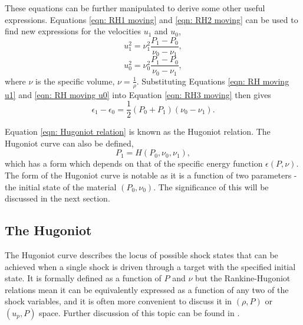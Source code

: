 These equations can be further manipulated to derive some other useful expressions. Equations \ref{eqn: RH1 moving} and \ref{eqn: RH2 moving} can be used to find new expressions for the velocities $u_1$ and $u_0$, 
\begin{equation} u_1^2 = \nu_1^2 \frac{P_1 - P_0}{\nu_0 - \nu_1}, \label{eqn: RH moving u1} \end{equation}
\begin{equation} u_0^2 = \nu_0^2 \frac{P_1 - P_0}{\nu_0 - \nu_1}, \label{eqn: RH moving u0} \end{equation}
where $\nu$ is the specific volume, $\nu = \frac{1}{\rho}$. Substituting Equations \ref{eqn: RH moving u1} and \ref{eqn: RH moving u0} into Equation \ref{eqn: RH3 moving} then gives
\begin{equation} \epsilon_1 - \epsilon_0 = \frac{1}{2}(P_0 + P_1)(\nu_0 - \nu_1).\label{eqn: Hugoniot relation} \end{equation}

Equation \ref{eqn: Hugoniot relation} is known as the Hugoniot relation. The Hugoniot curve can also be defined, 
\begin{equation} P_1 = H(P_0, \nu_0, \nu_1), \end{equation}
which has a form which depends on that of the specific energy function $\epsilon(P, \nu)$. The form of the Hugoniot curve is notable as it is a function of two parameters - the initial state of the material $(P_0, \nu_0)$. The significance of this will be discussed in the next section.

\subsection{The Hugoniot} \label{The Hugoniot theory}

The Hugoniot curve describes the locus of possible shock states that can be achieved when a single shock is driven through a target with the specified initial state. It is formally defined as a function of $P$ and $\nu$ but the Rankine-Hugoniot relations mean it can be equivalently expressed as a function of any two of the shock variables, and it is often more convenient to discuss it in $(\rho, P)$ or $(u_p, P)$ space. Further discussion of this topic can be found in \cite{Forbes2012}.


